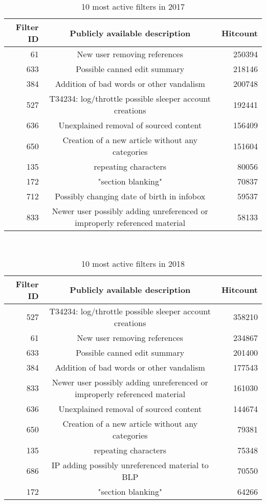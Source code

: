 \begin{table}
  \centering
  \begin{tabular}{r c r }
    Filter ID & Publicly available description & Hitcount \\
    \hline
    61 & New user removing references & 250394 \\
    633 & Possible canned edit summary & 218146 \\
    384 & Addition of bad words or other vandalism & 200748 \\
    527 & T34234: log/throttle possible sleeper account creations & 192441 \\
    636 & Unexplained removal of sourced content & 156409 \\
    650 & Creation of a new article without any categories & 151604 \\
    135 & repeating characters & 80056 \\
    172 & "section blanking" & 70837 \\
    712 & Possibly changing date of birth in infobox & 59537 \\
    833 & Newer user possibly adding unreferenced or improperly referenced material & 58133 \\
  \end{tabular}
  \caption{10 most active filters in 2017}~\label{tab:app-most-active-2017}
\end{table}

\begin{table}
  \centering
  \begin{tabular}{r c r }
    Filter ID & Publicly available description & Hitcount \\
    \hline
    527 & T34234: log/throttle possible sleeper account creations & 358210 \\
    61 & New user removing references & 234867 \\
    633 & Possible canned edit summary & 201400 \\
    384 & Addition of bad words or other vandalism & 177543 \\
    833 & Newer user possibly adding unreferenced or improperly referenced material & 161030 \\
    636 & Unexplained removal of sourced content & 144674 \\
    650 & Creation of a new article without any categories & 79381 \\
    135 & repeating characters & 75348 \\
    686 & IP adding possibly unreferenced material to BLP & 70550 \\
    172 & "section blanking" & 64266 \\
  \end{tabular}
  \caption{10 most active filters in 2018}~\label{tab:app-most-active-2018}
\end{table}

